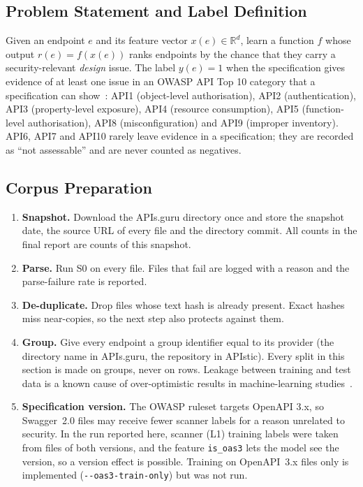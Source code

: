 \documentclass[conference]{IEEEtran}
\begin{document}
\subsection{Problem Statement and Label Definition}
\label{sec:m-prob}
Given an endpoint $e$ and its feature vector $x(e)\in\mathbb{R}^{d}$, learn a function $f$
whose output $r(e)=f(x(e))$ ranks endpoints by the chance that they carry a security-relevant
\emph{design} issue. The label $y(e)=1$ when the specification gives evidence of at least one
issue in an OWASP API Top 10 category that a specification can show~\cite{owasptop10}:
API1 (object-level authorisation), API2 (authentication), API3 (property-level exposure),
API4 (resource consumption), API5 (function-level authorisation), API8 (misconfiguration)
and API9 (improper inventory). API6, API7 and API10 rarely leave evidence in a specification;
they are recorded as ``not assessable'' and are never counted as negatives.

\subsection{Corpus Preparation}
\begin{enumerate}
\item \textbf{Snapshot.} Download the APIs.guru directory once and store the snapshot date,
the source URL of every file and the directory commit. All counts in the final report are
counts of this snapshot.
\item \textbf{Parse.} Run S0 on every file. Files that fail are logged with a reason and the
parse-failure rate is reported.
\item \textbf{De-duplicate.} Drop files whose text hash is already present. Exact hashes miss
near-copies, so the next step also protects against them.
\item \textbf{Group.} Give every endpoint a group identifier equal to its provider (the
directory name in APIs.guru, the repository in APIstic). Every split in this section is made
on groups, never on rows. Leakage between training and test data is a known cause of
over-optimistic results in machine-learning studies~\cite{kapoor}.
\item \textbf{Specification version.} The OWASP ruleset targets OpenAPI 3.x, so Swagger~2.0
files may receive fewer scanner labels for a reason unrelated to security. In the run reported here, scanner (L1)
training labels were taken from files of both versions, and the feature \texttt{is\_oas3} lets the model see the version, so a
version effect is possible. Training on OpenAPI~3.x files only is implemented (\texttt{-{}-oas3-train-only}) but was not run.
\end{enumerate}
\end{document}

